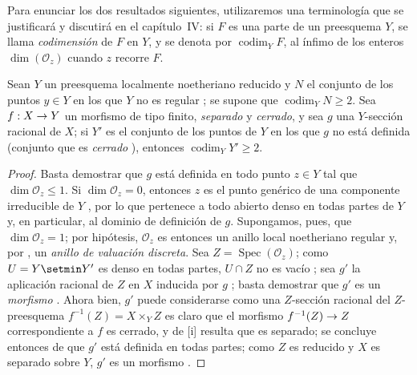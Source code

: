 \documentclass[oneside,10pt]{amsart}
\makeatletter
\renewcommand{\leq}{\leqslant}
\renewcommand{\geq}{\geqslant}
\newcommand{\ega@arrow}[2]{\mathchoice{#1}{#2}{#2}{#2}}
\renewcommand{\to}{\ega@arrow{\longrightarrow}{\rightarrow}}
\newcommand{\oldpage}[2][]{\marginnote{\normalfont\footnotesize\textbf{#1}~|~#2}\ignorespaces}
\let\EGAOriginalLabel\label
\renewcommand{\label}[1]{\phantomsection\EGAOriginalLabel{#1}}
\makeatother
\begin{document}
\begin{env}[7.3.4]
\label{II.7.3.4-fr}
Para enunciar los dos resultados siguientes, utilizaremos una terminología que se justificará y discutirá en el capítulo~IV:
si $F$ es una parte
\oldpage[II]{144}
de un preesquema $Y$, se llama \emph{codimensión} de $F$ en $Y$, y se denota por $\operatorname{codim}_YF$, al ínfimo de los enteros $\dim(\mathcal{O}_z)$ cuando $z$ recorre $F$.
\end{env}

\begin{corollary}[7.3.5]
\label{II.7.3.5-fr}
Sean $Y$ un preesquema localmente noetheriano reducido y $N$ el conjunto de los puntos $y\in Y$ en los que $Y$ no es regular \textup{};
se supone que $\operatorname{codim}_YN\geq2$.
Sea $f:X\to Y$ un morfismo de tipo finito, \emph{separado} y \emph{cerrado}, y sea $g$ una $Y$-sección racional de $X$;
si $Y'$ es el conjunto de los puntos de $Y$ en los que $g$ no está definida \textup{(conjunto que es \emph{cerrado} )}, entonces $\operatorname{codim}_YY'\geq2$.
\end{corollary}

\begin{proof}
Basta demostrar que $g$ está definida en todo punto $z\in Y$ tal que $\dim\mathcal{O}_z\leq1$.
Si $\dim\mathcal{O}_z=0$, entonces $z$ es el punto genérico de una componente irreducible de $Y$ , por lo que pertenece a todo abierto denso en todas partes de $Y$ y, en particular, al dominio de definición de $g$.
Supongamos, pues, que $\dim\mathcal{O}_z=1$;
por hipótesis, $\mathcal{O}_z$ es entonces un anillo local noetheriano regular y, por , un \emph{anillo de valuación discreta}.
Sea $Z=\operatorname{Spec}(\mathcal{O}_z)$;
como $U=Y\setmin Y'$ es denso en todas partes, $U\cap Z$ no es vacío ;
sea $g'$ la aplicación racional de $Z$ en $X$ inducida por $g$ ;
basta demostrar que $g'$ es un \emph{morfismo} .
Ahora bien, $g'$ puede considerarse como una $Z$-sección racional del $Z$-preesquema
$f^{-1}(Z)=X\times_YZ$
es claro que el morfismo $f^{-1}(Z)\to Z$ correspondiente a $f$ es cerrado, y de [i] resulta que es separado;
se concluye entonces de  que $g'$ está definida en todas partes;
como $Z$ es reducido y $X$ es separado sobre $Y$, $g'$ es un morfismo .
\end{proof}

\end{document}
